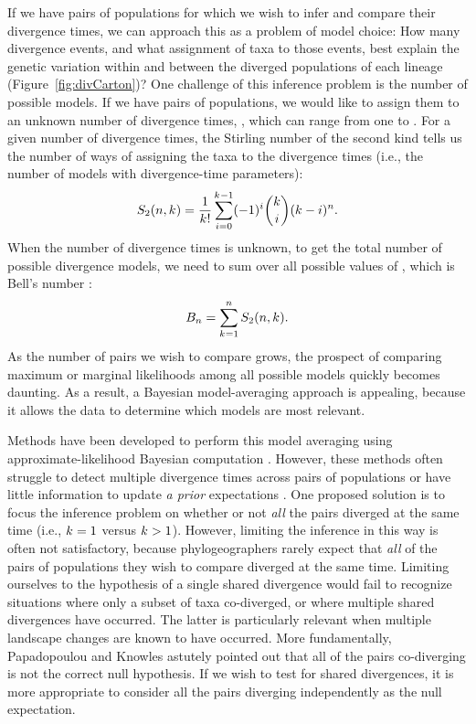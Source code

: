 \begin{linenomath}
If we have pairs of populations for which we wish to infer and compare their
divergence times, we can approach this as a problem of model choice:
How many divergence events, and what assignment of taxa to those events, best
explain the genetic variation within and between the diverged populations of
each lineage (Figure~\ref{fig:divCarton})?
One challenge of this inference problem is the number of possible models.
If we have \ncomparisons pairs of populations, we would like to assign them to an
unknown number of divergence times, \nevents, which can range from one to
\ncomparisons.
For a given number of divergence times, the Stirling number of the second kind
tells us the number of ways of assigning the taxa to the divergence times
(i.e., the number of models with \nevents divergence-time parameters):
\begin{equation}
    S_2(n, k_{}) = 
    \frac{1}{k_{}!} \sum_{i = 0}^{k_{} - 1} (-1)^{i}
    \binom{k_{}}{i} (k_{} - i)^{n}.
    \label{eq:stirling2}
\end{equation}
When the number of divergence times is unknown, to get the total number of
possible divergence models, we need to sum over all possible values of
\nevents, which is Bell's number \citep{Bell1934}:
\begin{equation}
    B_{n} = \sum_{k_{} = 1}^{n}
    S_2(n, k_{}).
    \label{eq:bell}
\end{equation}
As the number of pairs we wish to compare grows, the prospect of comparing
maximum or marginal likelihoods among all possible models quickly becomes
daunting.
As a result, a Bayesian model-averaging approach is appealing, because it
allows the data to determine which models are most relevant.
\end{linenomath}

Methods have been developed to perform this model averaging using
approximate-likelihood Bayesian computation
\citep{Hickerson2006,Huang2011,Oaks2014dpp}.
However, these methods often struggle to detect multiple divergence times
across pairs of populations \citep{Oaks2012, Oaks2014reply} or have little
information to update \emph{a prior} expectations \citep{Oaks2014dpp}.
One proposed solution is to focus the inference problem on whether or not
\emph{all} the pairs diverged at the same time (i.e., $k_{} = 1$ versus
$k_{} > 1$)\citep{Hickerson2013}.
However, limiting the inference in this way is often not satisfactory, because
phylogeographers rarely expect that \emph{all} of the pairs of populations they
wish to compare diverged at the same time.
Limiting ourselves to the hypothesis of a single shared divergence would fail
to recognize situations where only a subset of taxa co-diverged, or where
multiple shared divergences have occurred.
The latter is particularly relevant when multiple landscape changes are known
to have occurred.
More fundamentally, Papadopoulou and Knowles \citeyear{Papadopoulou2016}
astutely pointed out that all of the pairs co-diverging is not the correct null
hypothesis.
If we wish to test for shared divergences, it is more appropriate to consider
all the pairs diverging independently as the null expectation.

